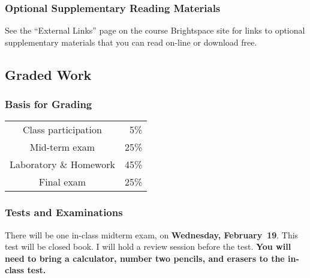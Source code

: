 \documentclass[11pt,twoside]{jgsyllabus}\usepackage[]{graphicx}\usepackage[]{color}
\begin{document}
\subsubsection[Optional Reading]{Optional Supplementary Reading Materials}
See the ``External Links'' page on the course Brightspace site for links to optional
supplementary materials that you can read on-line or download free.
\fi

\subsection{Graded Work}
%
%
%
\subsubsection[Grading]{Basis for Grading}

\begin{center}
	\begin{tabular}[t]{cr}
		Class participation & 5\%\\
		Mid-term exam & 25\%\\
		Laboratory \& Homework & 45\%\\
		Final exam   & 25\%\\
	\end{tabular}
\end{center}
%
%
%
%
\iffalse
\subsubsection{Homework}
Homework is due at the beginning of class on the day it is assigned.
Late homework will be accepted for half-credit if I receive it before I post the answer key on Brightspace (usually a week after the assignment is due).
\fi
%

\subsubsection{Tests and Examinations}
There will be one in-class midterm exam, on
\textbf{Wednesday, February~19}.
This test will be closed book.
I will hold a review session before the test.
\textbf{You will need to bring a calculator, number two pencils, and erasers
to the in-class test.}
\end{document}
